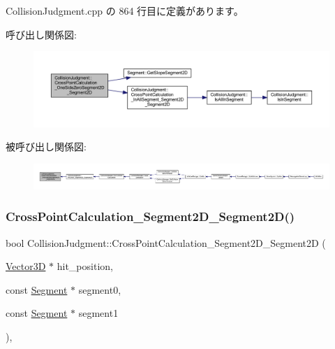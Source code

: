  Collision\+Judgment.\+cpp の 864 行目に定義があります。

呼び出し関係図\+:\nopagebreak
\begin{figure}[H]
\begin{center}
\leavevmode
\includegraphics[width=350pt]{class_collision_judgment_aef83b0d1bff8ede9c3e1f836694a3153_cgraph}
\end{center}
\end{figure}
被呼び出し関係図\+:
\nopagebreak
\begin{figure}[H]
\begin{center}
\leavevmode
\includegraphics[width=350pt]{class_collision_judgment_aef83b0d1bff8ede9c3e1f836694a3153_icgraph}
\end{center}
\end{figure}
\mbox{\label{class_collision_judgment_a25e0fb020e2a075322c9540bdd13b6c2}} 
\subsubsection{\texorpdfstring{Cross\+Point\+Calculation\+\_\+\+Segment2\+D\+\_\+\+Segment2\+D()}{CrossPointCalculation\_Segment2D\_Segment2D()}}
{\footnotesize\ttfamily bool Collision\+Judgment\+::\+Cross\+Point\+Calculation\+\_\+\+Segment2\+D\+\_\+\+Segment2D (\begin{DoxyParamCaption}\item[{\mbox{\hyperlink{class_vector3_d}{Vector3D}} $\ast$}]{hit\+\_\+position,  }\item[{const \mbox{\hyperlink{class_segment}{Segment}} $\ast$}]{segment0,  }\item[{const \mbox{\hyperlink{class_segment}{Segment}} $\ast$}]{segment1 }\end{DoxyParamCaption})\hspace{0.3cm}{\ttfamily [static]}, {\ttfamily [private]}}




